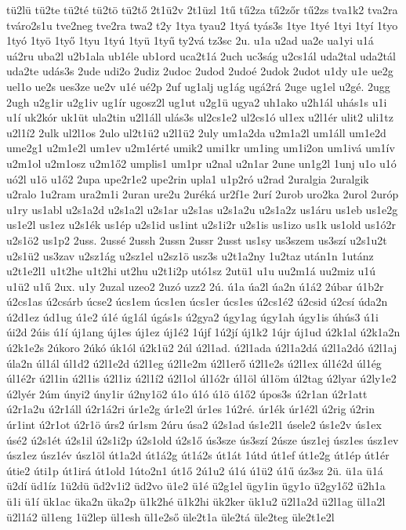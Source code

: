 {tü2lü
tü2te
tü2té
tü2tö
tü2tő
2t1ü2v
2t1üzl
1tű
tű2za
tű2zőr
tű2zs
tva1k2
tva2ra
tváro2s1u
tve2neg
tve2ra
twa2
t2y
1tya
tyau2
1tyá
tyás3s
1tye
1tyé
1tyi
1tyí
1tyo
1tyó
1työ
1tyő
1tyu
1tyú
1tyü
1tyű
ty2vá
tz3sc
2u.
u1a
u2ad
ua2e
ua1yi
u1á
uá2ru
uba2l
u2b1ala
ub1éle
ub1ord
uca2t1á
2uch
uc3ság
u2cs1ál
uda2tal
uda2tál
uda2te
udás3s
2ude
udi2o
2udiz
2udoc
2udod
2udoé
2udok
2udot
u1dy
u1e
ue2g
uel1o
ue2s
ues3ze
ue2v
u1é
ué2p
2uf
ug1alj
ug1ág
ugá2rá
2uge
ug1el
u2gé.
2ugg
2ugh
u2g1ir
u2g1iv
ug1ír
ugosz2l
ug1ut
u2g1ü
ugya2
uh1ako
u2h1ál
uhás1s
u1i
u1í
uk2kór
uk1üt
ula2tin
u2l1áll
ulás3s
ul2cs1e2
ul2cs1ó
ul1ex
u2l1ér
ulit2
uli1tz
u2l1í2
2ulk
ul2l1os
2ulo
ul2t1ü2
u2l1ü2
2uly
um1a2da
u2m1a2l
um1áll
um1e2d
ume2g1
u2m1e2l
um1ev
u2m1érté
umik2
umi1kr
um1ing
um1i2on
um1ivá
um1ív
u2m1ol
u2m1osz
u2m1ő2
umplis1
um1pr
u2nal
u2n1ar
2une
un1g2l
1unj
u1o
u1ó
uó2l
u1ö
u1ő2
2upa
upe2r1e2
upe2rin
upla1
u1p2ró
u2rad
2uralgia
2uralgik
u2ralo
1u2ram
ura2m1i
2uran
ure2u
2uréká
ur2f1e
2urí
2urob
uro2ka
2urol
2uróp
u1ry
us1abl
u2s1a2d
u2s1a2l
u2s1ar
u2s1as
u2s1a2u
u2s1a2z
us1áru
us1eb
us1e2g
us1e2l
us1ez
u2s1ék
us1ép
u2s1id
us1int
u2s1i2r
u2s1is
us1izo
us1k
us1old
us1ó2r
u2s1ö2
us1p2
2uss.
2ussé
2ussh
2ussn
2ussr
2usst
us1sy
us3szem
us3szí
u2s1u2t
u2s1ü2
us3zav
u2sz1ág
u2sz1el
u2sz1ö
usz3s
u2t1a2ny
1u2taz
után1n
1utánz
u2t1e2l1
u1t2he
u1t2hi
ut2hu
u2t1i2p
utó1sz
2utü1
u1u
uu2m1á
uu2miz
u1ú
u1ü2
u1ű
2ux.
u1y
2uzal
uzeo2
2uzó
uzz2
2ú.
ú1a
úa2l
úa2n
ú1á2
2úbar
ú1b2r
ú2cs1as
ú2csárb
úcse2
úcs1em
úcs1en
úcs1er
úcs1es
ú2cs1é2
ú2csid
ú2csí
úda2n
ú2d1ez
úd1ug
ú1e2
ú1é
úg1ál
úgás1s
ú2gya2
úgy1ag
úgy1ah
úgy1is
úhús3
ú1i
úi2d
2úis
ú1í
új1ang
új1es
új1ez
új1é2
1újf
1ú2jí
új1k2
1újr
új1ud
ú2k1al
ú2k1a2n
ú2k1e2s
2úkoro
2úkó
úk1ól
ú2k1ü2
2úl
ú2l1ad.
ú2l1ada
ú2l1a2dá
ú2l1a2dó
ú2l1aj
úla2n
úl1ál
úl1d2
ú2l1e2d
ú2l1eg
ú2l1e2m
ú2l1erő
ú2l1e2s
ú2l1ex
úl1é2d
úl1ég
úl1é2r
ú2l1in
ú2l1is
ú2l1iz
ú2l1í2
ú2l1ol
úl1ó2r
úl1öl
úl1öm
úl2tag
ú2lyar
ú2ly1e2
ú2lyér
2úm
únyi2
úny1ir
ú2ny1ö2
ú1o
ú1ó
ú1ö
ú1ő2
úpos3s
ú2r1an
ú2r1att
ú2r1a2u
ú2r1áll
ú2r1á2ri
úr1e2g
úr1e2l
úr1es
1ú2ré.
úr1ék
úr1é2l
ú2rig
ú2rin
úr1int
ú2r1ot
ú2r1ö
úrs2
úr1sm
2úru
úsa2
ú2s1ad
ús1e2l1
úsele2
ús1e2v
ús1ex
úsé2
ú2s1ét
ú2s1il
ú2s1i2p
ú2s1old
ú2s1ő
ús3sze
ús3szí
2úsze
úsz1ej
úsz1es
úsz1ev
úsz1ez
úsz1év
úsz1öl
út1a2d
út1á2g
út1á2s
út1át
1útd
út1ef
út1e2g
út1ép
út1ér
útie2
úti1p
út1irá
út1old
1úto2n1
út1ő
2ú1u2
ú1ú
ú1ü2
ú1ű
úz3sz
2ü.
ü1a
ü1á
ü2dí
üd1íz
1ü2dü
üd2v1i2
üd2vo
ü1e2
ü1é
ü2g1el
ügy1in
ügy1o
ü2gy1ő2
ü2h1a
ü1i
ü1í
ük1ac
üka2n
üka2p
ü1k2hé
ü1k2hi
ük2ker
ük1u2
ü2l1a2d
ü2l1ag
ül1a2l
ü2l1á2
ül1eng
1ü2lep
ül1esh
ül1e2ső
üle2t1a
üle2tá
üle2teg
üle2t1e2l
}
